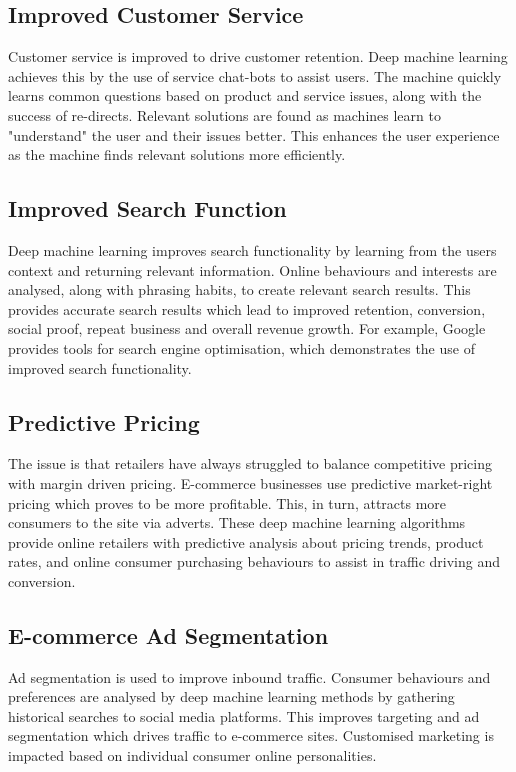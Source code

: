 \documentclass{article}
\begin{document}
\subsection{Improved Customer Service}
Customer service is improved to drive customer retention. Deep machine learning achieves this by the use of service chat-bots to assist users. The machine quickly learns common questions based on product and service issues, along with the success of re-directs. Relevant solutions are found as machines learn to "understand" the user and their issues better.\cite{201710170500PR.NEWS.USPR.MN1534920171017} This enhances the user experience as the machine finds relevant solutions more efficiently.

\subsection{Improved Search Function}
Deep machine learning improves search functionality by learning from the users context and returning relevant information. Online behaviours and interests are analysed, along with phrasing habits, to create relevant search results. This provides accurate search results which lead to improved retention, conversion, social proof, repeat business and overall revenue growth.\cite{201710170500PR.NEWS.USPR.MN1534920171017} For example, Google provides tools for search engine optimisation, which demonstrates the use of improved search functionality.\cite{gmit.9057820080101}

\subsection{Predictive Pricing}
The issue is that retailers have always struggled to balance competitive pricing with margin driven pricing. E-commerce businesses use predictive market-right pricing which proves to be more profitable. This, in turn, attracts more consumers to the site via adverts. These deep machine learning algorithms provide online retailers with predictive analysis about pricing trends, product rates, and online consumer purchasing behaviours to assist in traffic driving and conversion.\cite{201710170500PR.NEWS.USPR.MN1534920171017}

\subsection{E-commerce Ad Segmentation}
Ad segmentation is used to improve inbound traffic. Consumer behaviours and preferences are analysed by deep machine learning methods by gathering historical searches to social media platforms. This improves targeting and ad segmentation which drives traffic to e-commerce sites.\cite{201710170500PR.NEWS.USPR.MN1534920171017} Customised marketing is impacted based on individual consumer online personalities.
\end{document}
